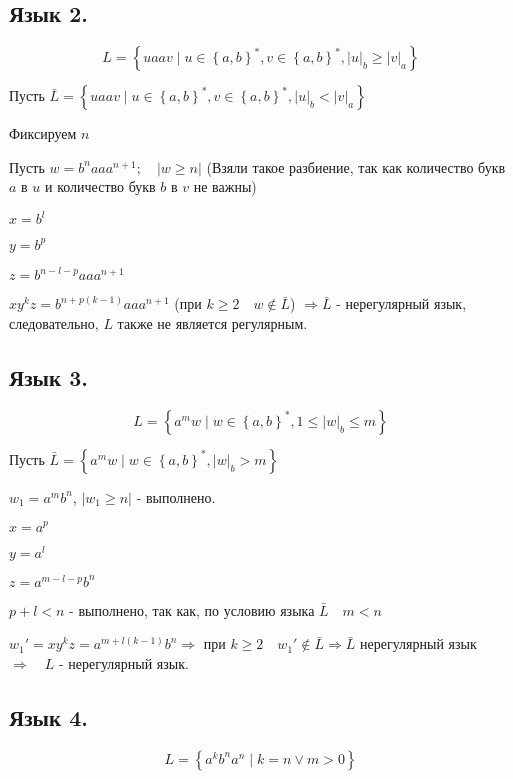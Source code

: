 \documentclass[a4paper]{article}
\begin{document}
\subsection{Язык 2.}
$$ L = \left\{ uaav \mid u \in \left\{ a, b \right\}^{*}, v \in \left\{ a, b \right\}^{*}, \left| u \right|_{b} \geq \left| v \right|_{a} \right\} $$


Пусть $ \bar{L} = \left\{ uaav \mid u \in \left\{ a, b \right\}^{*}, v \in \left\{ a, b \right\}^{*}, \left| u \right|_{b} < \left| v \right|_{a} \right\} $

Фиксируем $ n $

Пусть $ w = b^{n} aa a^{n+1}; \quad \left| w \geq n \right| $ (Взяли такое разбиение, так как количество букв $ a $ в $ u $ и количество букв $ b $ в $ v $ не важны)

$ x = b^{l} $ 

$ y = b^{p} $

$ z = b^{n-l-p}aaa^{n+1} $

$ xy^{k}z = b^{n+p(k-1)}aaa^{n+1} $ (при $ k \geq 2 \quad w \notin \bar{L} $) $ \Rightarrow  \bar{L} $ - нерегулярный язык, следовательно, $ L $ также не является регулярным.



\subsection{Язык 3.}
$$ L = \left\{ a^{m}w \mid w \in \left\{ a, b \right\}^{*}, 1 \leq \left| w \right|_{b} \leq m \right\} $$

Пусть $ \bar{L} = \left\{ a^{m}w \mid w \in \left\{ a, b \right\}^{*},  \left| w \right|_{b} > m \right\} $

$ w_{1} = a^{m}b^{n} $, $ \left| w_{1} \geq n \right| $ - выполнено.

$ x = a^{p} $

$ y = a^{l} $

$ z = a^{m-l-p}b^{n} $

$ p + l < n $ - выполнено, так как, по условию языка $ \bar{L}  \quad m < n$

$ w_{1}' = xy^{k}z = a^{m+l(k-1)}b^{n} \Rightarrow$ при $ k \geq 2 \quad w_{1}' \notin \bar{L} \Rightarrow \bar{L}$ нерегулярный язык $ \Rightarrow \quad L$ - нерегулярный язык.



\subsection{Язык 4.}
$$ L = \left\{ a^{k}b^{n}a^{n} \mid k = n \vee m > 0 \right\}$$
\end{document}
